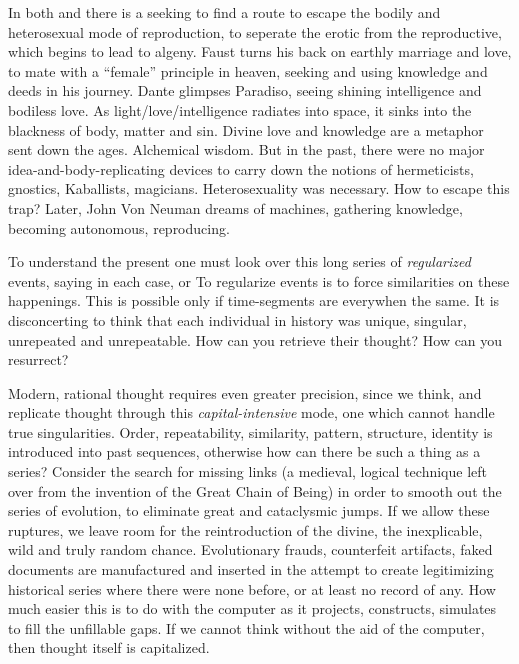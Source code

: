 In both  and 
there is a seeking to find a route to escape the
bodily and heterosexual mode of reproduction, to seperate the erotic from the reproductive, which begins to lead to algeny.
Faust turns his back on earthly marriage and
love, to mate with a \enquote{female} principle in
heaven, seeking and using knowledge and
deeds in his journey. Dante glimpses Paradiso, seeing shining intelligence and bodiless love. As light\slash love\slash intelligence radiates into space, it sinks into the blackness of
body, matter and sin. Divine love and knowledge are a metaphor sent down the ages.
Alchemical wisdom. But in the past, there
were no major idea-and-body-replicating
devices to carry down the notions of hermeticists, gnostics, Kaballists, magicians.
Heterosexuality was necessary. How to escape this trap? Later, John Von Neuman
dreams of machines, gathering knowledge,
becoming autonomous, reproducing.

To understand the present one must look
over this long series of \emph{regularized} events,
saying in each case,  or  To
regularize events is to force similarities on
these happenings. This is possible only if
time-segments are everywhen the same. It is
disconcerting to think that each individual
in history was unique, singular, unrepeated
and unrepeatable. How can you retrieve
their thought? How can you resurrect?

Modern, rational thought requires even
greater precision, since we think, and replicate thought through this \emph{capital-intensive}
mode, one which cannot handle true singularities. Order, repeatability, similarity, pattern, structure,
identity is introduced into past sequences, otherwise how can there be
such a thing as a series? Consider the search
for missing links (a medieval, logical technique left over from the invention of the
Great Chain of Being) in order to smooth out
the series of evolution, to eliminate great and
cataclysmic jumps. If we allow these ruptures, we leave room for the reintroduction
of the divine, the inexplicable, wild and truly random chance. Evolutionary frauds,
counterfeit artifacts, faked documents are
manufactured and inserted in the attempt to
create legitimizing historical series where
there were none before, or at least no record
of any. How much easier this is to do with
the computer as it projects, constructs, simulates to fill the unfillable gaps. If we cannot
think without the aid of the computer, then
thought itself is capitalized.

